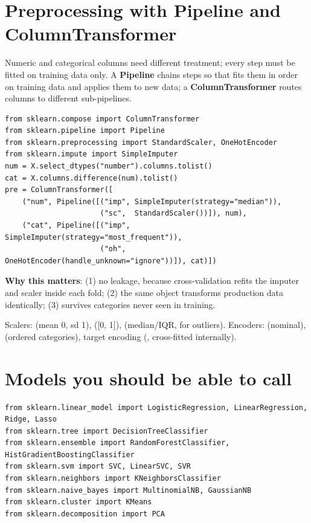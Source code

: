 \section{Preprocessing with Pipeline and ColumnTransformer}
Numeric and categorical columns need different treatment; every step must be fitted on training data only. A \textbf{Pipeline} chains steps so that  fits them in
order on training data and  applies them to new data; a \textbf{ColumnTransformer} routes columns to different sub-pipelines.
\begin{lstlisting}
from sklearn.compose import ColumnTransformer
from sklearn.pipeline import Pipeline
from sklearn.preprocessing import StandardScaler, OneHotEncoder
from sklearn.impute import SimpleImputer
num = X.select_dtypes("number").columns.tolist()
cat = X.columns.difference(num).tolist()
pre = ColumnTransformer([
    ("num", Pipeline([("imp", SimpleImputer(strategy="median")),
                      ("sc",  StandardScaler())]), num),
    ("cat", Pipeline([("imp", SimpleImputer(strategy="most_frequent")),
                      ("oh",  OneHotEncoder(handle_unknown="ignore"))]), cat)])
\end{lstlisting}
\textbf{Why this matters}: (1) no leakage, because cross-validation refits the imputer and scaler inside each fold; (2) the same object transforms production data identically;
(3)  survives categories never seen in training.

Scalers:  (mean 0, sd 1),  ([0, 1]),  (median/IQR, for outliers). Encoders:  (nominal),
 (ordered categories), target encoding (, cross-fitted internally).

\section{Models you should be able to call}
\begin{lstlisting}
from sklearn.linear_model import LogisticRegression, LinearRegression, Ridge, Lasso
from sklearn.tree import DecisionTreeClassifier
from sklearn.ensemble import RandomForestClassifier, HistGradientBoostingClassifier
from sklearn.svm import SVC, LinearSVC, SVR
from sklearn.neighbors import KNeighborsClassifier
from sklearn.naive_bayes import MultinomialNB, GaussianNB
from sklearn.cluster import KMeans
from sklearn.decomposition import PCA
\end{lstlisting}

